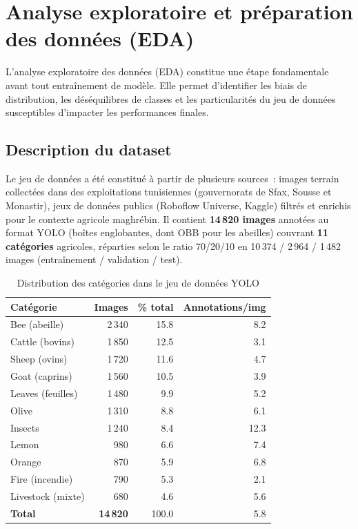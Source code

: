 \section{Analyse exploratoire et préparation des données (EDA)}

L'analyse exploratoire des données (EDA) constitue une étape fondamentale avant
tout entraînement de modèle. Elle permet d'identifier les biais de distribution,
les déséquilibres de classes et les particularités du jeu de données susceptibles
d'impacter les performances finales.

\subsection{Description du dataset}

Le jeu de données a été constitué à partir de plusieurs sources~: images terrain
collectées dans des exploitations tunisiennes (gouvernorats de Sfax, Sousse et Monastir),
jeux de données publics (Roboflow Universe, Kaggle) filtrés et enrichis pour le
contexte agricole maghrébin. Il contient \textbf{14\,820 images} annotées au format
YOLO (boîtes englobantes, dont OBB pour les abeilles) couvrant \textbf{11 catégories}
agricoles, réparties selon le ratio 70/20/10 en 10\,374 / 2\,964 / 1\,482 images
(entraînement / validation / test).

\begin{table}[H]
\centering
\caption{Distribution des catégories dans le jeu de données YOLO}
\label{tab:yolo_data}
\begin{tabular}{lrrr}
\toprule
\textbf{Catégorie} & \textbf{Images} & \textbf{\% total} & \textbf{Annotations/img} \\
\midrule
Bee (abeille)     & 2\,340 & 15.8 & 8.2 \\
Cattle (bovins)   & 1\,850 & 12.5 & 3.1 \\
Sheep (ovins)     & 1\,720 & 11.6 & 4.7 \\
Goat (caprins)    & 1\,560 & 10.5 & 3.9 \\
Leaves (feuilles) & 1\,480 &  9.9 & 5.2 \\
Olive             & 1\,310 &  8.8 & 6.1 \\
Insects           & 1\,240 &  8.4 & 12.3 \\
Lemon             &   980  &  6.6 & 7.4 \\
Orange            &   870  &  5.9 & 6.8 \\
Fire (incendie)   &   790  &  5.3 & 2.1 \\
Livestock (mixte) &   680  &  4.6 & 5.6 \\
\midrule
\textbf{Total}    & \textbf{14\,820} & 100.0 & 5.8 \\
\bottomrule
\end{tabular}
\end{table}

